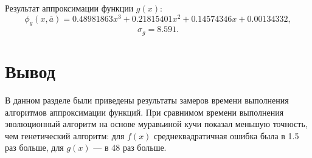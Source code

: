 Результат аппроксимации функции $g(x)$: 
\begin{equation}
	\phi_g(x, \overline{a}) = 0.48981863x^3+0.21815401x^2+0.14574346x+0.00134332,
	\end{equation}
	\begin{equation}
	\sigma_g = 8.591.
\end{equation}

\section*{Вывод}

В данном разделе были приведены результаты замеров времени выполнения алгоритмов аппроксимации функций. При сравнимом времени выполнения эволюционный алгоритм на основе муравьиной кучи показал меньшую точность, чем генетический алгоритм: для $f(x)$ среднеквадратичная ошибка была в 1.5 раз больше, для $g(x)$ --- в 48 раз больше.

\clearpage

